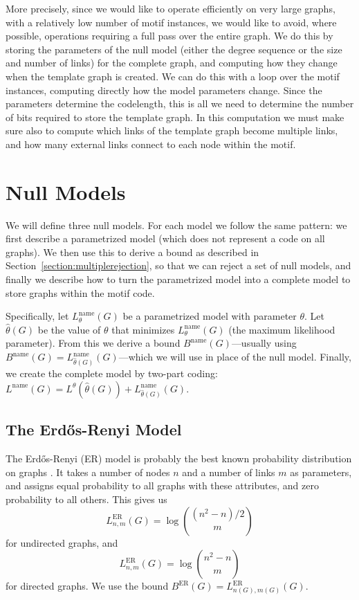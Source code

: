 \documentclass[twoside,11pt]{article}
\begin{document}
More precisely, since we would like to operate efficiently on very large graphs, with a relatively low number of motif instances, we would like to avoid, where possible, operations requiring a full pass over the entire graph. We do this by storing the parameters of the null model (either the degree sequence or the size and number of links) for the complete graph, and computing how they change when the template graph is created. We can do this with a loop over the motif instances, computing directly how the model parameters change. Since the parameters determine the codelength, this is all we need to determine the number of bits required to store the template graph. In this computation we must make sure also to compute which links of the template graph become multiple links, and how many external links connect to each node within the motif. 

\section{Null Models}

\label{section:null-models}
We will define three null models. For each model we follow the same pattern: we first describe a parametrized model (which does not represent a code on all graphs). We then use this to derive a bound as described in Section~\ref{section:multiplerejection}, so that we can reject a set of null models, and finally we describe how to turn the parametrized model into a complete model to store graphs within the motif code.  

Specifically, let $L^\text{name}_\theta(G)$ be a parametrized model with parameter $\theta$. Let $\hat\theta(G)$ be the value of $\theta$ that minimizes $L^\text{name}_\theta(G)$ (the maximum likelihood parameter). From this we derive a bound $B^\text{name}(G)$---usually using $B^\text{name}(G) = L^\text{name}_{\hat\theta(G)}(G)$---which we will use in place of the null model. Finally, we create the complete model by two-part coding: $L^\text{name}(G) = L^{\theta}(\hat\theta(G)) + L^\text{name}_{\hat\theta(G)}(G)$. 

\subsection{The Erd\H{o}s-Renyi Model}
\label{section:null models}

The Erd\H{o}s-Renyi (ER) model is probably the best known probability distribution on graphs \citep{renyi1959random,gilbert1959random}. It takes a number of nodes $n$ and a number of links $m$ as parameters, and assigns equal probability to all graphs with these attributes, and zero probability to all others. This gives us 
\[
L^\text{ER}_{n, m}(G) = \log{(n^2-n)/2 \choose m} 
\] 
for undirected graphs, and 
\[
L^\text{ER}_{n, m}(G) = \log{n^2-n \choose m} 
\] 
for directed graphs. We use the bound $B^\text{ER}(G) = L^\text{ER}_{n(G), m(G)}(G)$.
\end{document}
